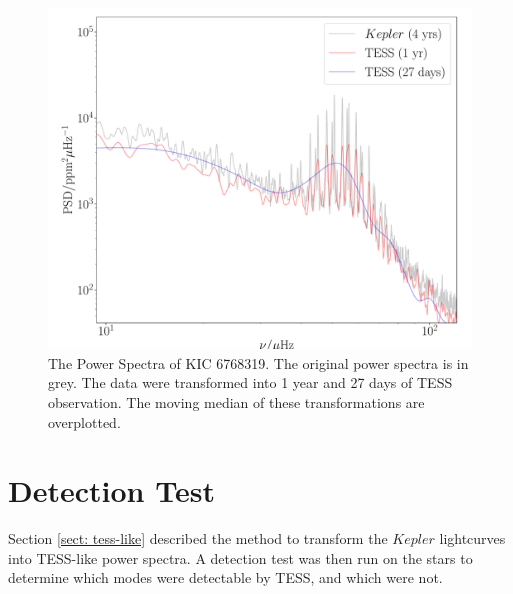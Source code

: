 \documentclass[a4paper,fleqn,usenatbib,useAMS]{mnras}
\newcommand{\kep}{\ensuremath{Kepler}\:}
\begin{document}
\begin{figure}
	\centering
	\includegraphics[scale=0.3]{diagnostic_plot4_modes}
	\caption{The Power Spectra of KIC 6768319. The original power spectra is in grey. The data were transformed into 1 year and 27 days of TESS observation. The moving median of these transformations are overplotted.}	
	\label{overplotted PS}
\end{figure} 

\section{Detection Test}
\label{sect: det_test}

Section \ref{sect: tess-like} described the method to transform the $Kepler$ lightcurves into TESS-like power spectra. A detection test was then run on the stars to determine which modes were detectable by TESS, and which were not.
\end{document}
